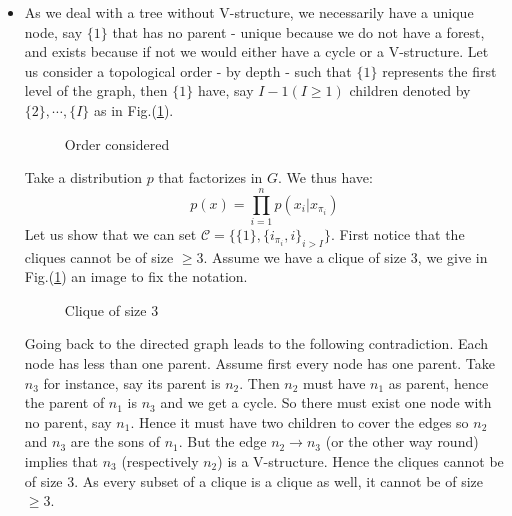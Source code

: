 \documentclass[10pt]{article}
\begin{document}
\begin{itemize}
\item As we deal with a tree without V-structure, we necessarily have a unique node, say $\{1\}$ that has no parent - unique because we do not have a forest, and exists because if not we would either have a cycle or a V-structure. Let us consider a topological order - by depth - such that $\{1\}$ represents the first level of the graph, then $\{1\}$ have, say $I-1 (I\geq 1)$ children denoted by $\{2\},\cdots, \{I\}$ as in Fig.(\ref{fig2}).
\begin{figure}[h!]
\centering
{}
\caption{Order considered}
\label{fig2}
\end{figure}

Take a distribution $p$ that factorizes in $G$. We thus have: 
\begin{equation}
p(x) = \prod_{i=1}^n p(x_i | x_{\pi_i})
\end{equation}
Let us show that we can set $\mathcal{C} = \{ \{1\}, \{i_{\pi_i}, i\}_{i > I} \}$. First notice that the cliques cannot be of size $\geq 3$. Assume we have a clique of size 3, we give in Fig.(\ref{fig2}) an image to fix the notation. 
\begin{figure}[h!]
\centering
{}
\caption{Clique of size 3}
\label{fig3}
\end{figure}

Going back to the directed graph leads to the following contradiction. Each node has less than one parent. Assume first every node has one parent. Take $n_3$ for instance, say its parent is $n_2$. Then $n_2$ must have $n_1$ as parent, hence the parent of $n_1$ is $n_3$ and we get a cycle. So there must exist one node with no parent, say $n_1$. Hence it must have two children to cover the edges so $n_2$ and $n_3$ are the sons of $n_1$. But the edge $n_2 \rightarrow n_3$ (or the other way round) implies that $n_3$ (respectively $n_2$) is a V-structure. Hence the cliques cannot be of size 3. As every subset of a clique is a clique as well, it cannot be of size $\geq 3$.



\end{itemize}
\end{document}
